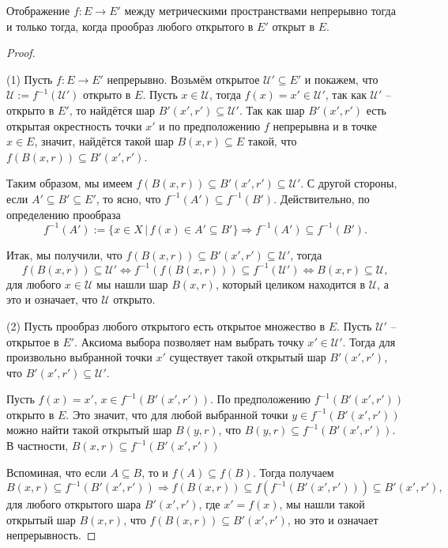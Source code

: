 \begin{theorem}\label{preimage_of_open}
    Отображение $f:E \to E'$ между метрическими пространствами непрерывно тогда и только тогда, когда прообраз любого открытого в $E'$ открыт в $E.$
\end{theorem}
\begin{proof}~

(1) Пусть $f:E \to E'$ непрерывно. Возьмём открытое $\mathscr{U}' \subseteq E'$ и покажем, что $\mathscr{U}:=f^{-1}(\mathscr{U'})$ открыто в $E$. Пусть $x \in \mathscr{U}$, тогда $f(x) = x' \in \mathscr{U}'$, так как $\mathscr{U}'$ -- открыто в $E'$, то найдётся шар $B'(x',r') \subseteq \mathscr{U}'$. Так как шар $B'(x',r')$ есть открытая окрестность точки $x'$ и по предположению $f$ непрерывна и в точке $x \in E$, значит, найдётся такой шар $B(x,r) \subseteq E$ такой, что $f(B(x,r)) \subseteq B'(x',r')$. 

Таким образом, мы имеем $f(B(x,r)) \subseteq B'(x',r') \subseteq \mathscr{U}' .$ С другой стороны, если $A'\subseteq B' \subseteq E'$, то ясно, что $f^{-1}(A') \subseteq f^{-1}(B')$. Действительно, по определению прообраза
    \[
     f^{-1}(A'):= \{x \in X\, |\, f(x) \in A' \subseteq B'\} \Longrightarrow f^{-1}(A') \subseteq f^{-1}(B').
    \]

 Итак, мы получили, что $f(B(x,r)) \subseteq B'(x',r') \subseteq \mathscr{U}'$, тогда
 \[
  f(B(x,r)) \subseteq \mathscr{U}' \Longleftrightarrow f^{-1}(f(B(x,r))) \subseteq f^{-1}(\mathscr{U}')  \Longleftrightarrow B(x,r) \subseteq \mathscr{U},
 \]
 \ie для любого $x \in \mathscr{U}$ мы нашли шар $B(x,r)$, который целиком находится в $\mathscr{U}$, а это и означает, что $\mathscr{U}$ открыто.

(2) Пусть прообраз любого открытого есть открытое множество в $E.$ Пусть $\mathscr{U}'$ -- открытое в $E'$. Аксиома выбора позволяет нам выбрать точку $x' \in \mathscr{U}'$. Тогда для произвольно выбранной точки $x'$ существует такой открытый шар $B'(x',r')$, что $B'(x',r') \subseteq \mathscr{U}'.$

Пусть $f(x) = x'$, \ie $x \in f^{-1}(B'(x',r'))$. По предположению $f^{-1}(B'(x',r'))$ открыто в $E$. Это значит, что для любой выбранной точки $y \in f^{-1}(B'(x',r'))$ можно найти такой открытый шар $B(y,r)$, что $B(y,r) \subseteq f^{-1}(B'(x',r'))$. В частности, $B(x,r) \subseteq f^{-1}(B'(x',r'))$ 

Вспоминая, что если $A \subseteq B$, то и $f(A) \subseteq f(B)$. Тогда получаем 
\[
  B(x,r) \subseteq f^{-1}(B'(x',r')) \Longrightarrow f(B(x,r)) \subseteq f(f^{-1}(B'(x',r'))) \subseteq B'(x',r'),
\]
\ie для любого открытого шара $B'(x',r')$, где $x' = f(x)$, мы нашли такой открытый шар $B(x,r)$, что $f(B(x,r)) \subseteq B'(x',r')$, но это и означает непрерывность.
\end{proof}

